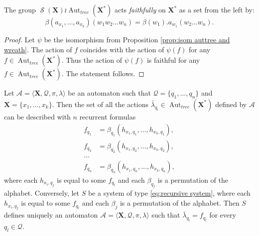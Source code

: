\documentclass[mat1]{fmfdeloTS2.0}
\newcommand{\abece}{\mathbf{X}}			%
\newcommand{\fslovar}{\mathbf{X^*}}		%
\newcommand{\auto}{\mathcal}			%
\newcommand{\QQ}{\mathcal{Q}}			%
\newcommand{\LAMBDA}{\bar{\lambda}}			%
\DeclareMathOperator{\aut}{\mathrm{Aut}}		%
\DeclareMathOperator{\symm}{\mathcal{S}}		%
\begin{document}
\begin{proposition}
The group $\symm(\abece)\wr\aut_{tree}(\fslovar)$ acts \emph{faithfully} on $\fslovar$ as a set from the left by:
$$\beta(a_{x_1},\ldots,a_{x_k})(w_1 w_2\ldots w_n)=\beta(w_1).a_{w_1}(w_2\ldots w_n).$$
\end{proposition}
\begin{proof}
Let $\psi$ be the isomorphism from Proposition \ref{prop:isom auttree and wreath}. The action of $f$ coincides with the action of $\psi(f)$ for any $f\in\aut_{tree}(\fslovar)$. Thus the action of $\psi(f)$ is faithful for any $f\in\aut_{tree}(\fslovar)$. The statement follows.
\end{proof}

\begin{proposition}\label{prop:definition of auto by formulas}
Let $\auto{A}=\langle\abece,\QQ,\pi,\lambda\rangle$ be an automaton such that $\QQ=\{q_1,\ldots,q_n\}$ and $\abece=\{x_1,\ldots,x_k\}$. Then the set of all the actions $\LAMBDA_{q_l}\in\aut_{tree}(\fslovar)$ defined by $\auto{A}$ can be described with $n$ recurrent formulas
\begin{equation}
\begin{split}
f_{q_1}&=\beta_{q_1}(h_{x_1,q_1},\ldots,h_{x_k,q_1}),\\
f_{q_2}&=\beta_{q_2}(h_{x_1,q_2},\ldots,h_{x_k,q_2}),\\
\ldots\\
f_{q_n}&=\beta_{q_n}(h_{x_1,q_n},\ldots,h_{x_k,q_n}),
\label{eq:recursive system}
\end{split}
\end{equation}
where each $h_{x_i,q_j}$ is equal to some $f_{q_l}$ and each $\beta_{q_j}$ is a permutation of the alphabet.
Conversely, let $S$ be a system of type \eqref{eq:recursive system}, where each $h_{x_i,q_j}$ is equal to some $f_{q_l}$ and each $\beta_j$ is a permutation of the alphabet. Then $S$ defines uniquely an automaton $\auto{A}=\langle\abece,\QQ,\pi,\lambda\rangle$ such that $\LAMBDA_{q_l}=f_{q_l}$ for every $q_l\in\QQ$.
\end{proposition}
\end{document}
